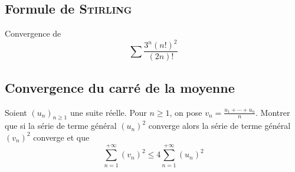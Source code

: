 \subsection{Formule de \textsc{Stirling}}

Convergence de 
\[
    \sum\frac{3^n(n!)^2}{(2n)!}
\]

\subsection{Convergence du carré de la moyenne}

Soient $(u_n)_{n\geqslant 1}$ une suite réelle. Pour $n \geqslant 1$, on pose $v_n = \frac{u_1 + \cdots + u_n}{n}$. Montrer que si la série de terme général $(u_n)^2$ converge alors la série de terme général $(v_n)^2$ converge et que 
\[
    \sum\limits_{n=1}^{+\infty} (v_n)^2 \leqslant 4 \sum_{n=1}^{+\infty} (u_n)^2
\]



